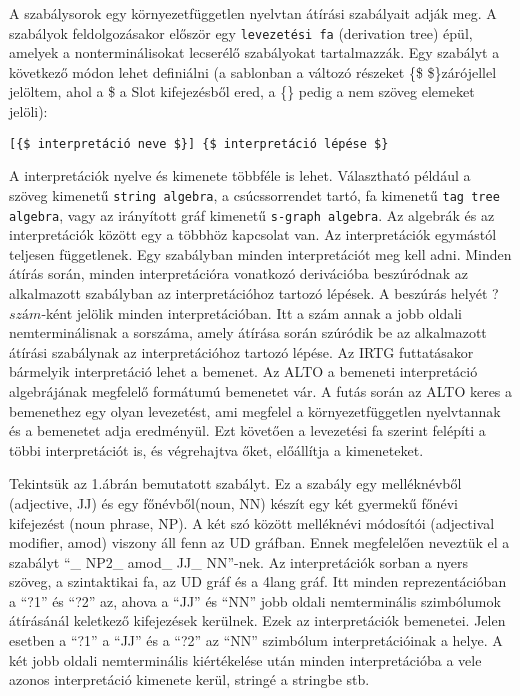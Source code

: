 A szabálysorok egy környezetfüggetlen nyelvtan átírási szabályait adják meg. A szabályok feldolgozásakor először egy \texttt{levezetési fa} (derivation tree) épül, amelyek a nonterminálisokat lecserélő szabályokat tartalmazzák. Egy szabályt a következő módon lehet definiálni (a sablonban a változó részeket \{\$ \$\}zárójellel jelöltem, ahol a \$ a Slot kifejezésből ered, a \{\} pedig a nem szöveg elemeket jelöli):
\begin{verbatim}
[{$ interpretáció neve $}] {$ interpretáció lépése $}
\end{verbatim}
A interpretációk nyelve és kimenete többféle is lehet.  Választható például a szöveg kimenetű \texttt{string algebra}, a csúcssorrendet tartó, fa kimenetű \texttt{tag tree algebra}, vagy  az irányított gráf kimenetű \texttt{s-graph algebra}. Az algebrák és az interpretációk között egy a többhöz kapcsolat van. Az interpretációk egymástól teljesen függetlenek. Egy szabályban minden interpretációt meg kell adni. Minden átírás során, minden interpretációra vonatkozó derivációba beszúródnak az alkalmazott szabályban az interpretációhoz tartozó lépések. A beszúrás helyét ?{$  szám $}-ként jelölik minden interpretációban. Itt a szám annak a jobb oldali nemterminálisnak a sorszáma, amely átírása során szúródik be az alkalmazott átírási szabálynak az interpretációhoz tartozó lépése. Az IRTG futtatásakor bármelyik interpretáció lehet a bemenet. Az ALTO a bemeneti interpretáció algebrájának megfelelő formátumú bemenetet vár. A futás során az ALTO keres a bemenethez egy olyan levezetést, ami megfelel a környezetfüggetlen nyelvtannak és a bemenetet adja eredményül. Ezt követően a levezetési fa szerint felépíti a többi interpretációt is, és végrehajtva őket, előállítja a kimeneteket.

Tekintsük az 1.ábrán bemutatott szabályt. Ez a szabály egy melléknévből (adjective, JJ) és egy főnévből(noun, NN) készít egy két gyermekű főnévi kifejezést (noun phrase, NP). A két szó között melléknévi módosítói (adjectival modifier, amod) viszony áll fenn az UD gráfban. Ennek megfelelően neveztük el a szabályt “\_ NP2\_ amod\_ JJ\_ NN”-nek. Az interpretációk sorban a nyers szöveg, a szintaktikai fa, az UD gráf és a 4lang gráf.
Itt minden reprezentációban a “?1” és “?2” az, ahova a “JJ” és “NN” jobb oldali nemterminális szimbólumok átírásánál keletkező kifejezések kerülnek. Ezek az interpretációk bemenetei. Jelen esetben a “?1” a “JJ” és a “?2” az “NN” szimbólum interpretációinak a helye. A két jobb oldali nemterminális kiértékelése után minden interpretációba a vele azonos interpretáció kimenete kerül, stringé a stringbe stb.

